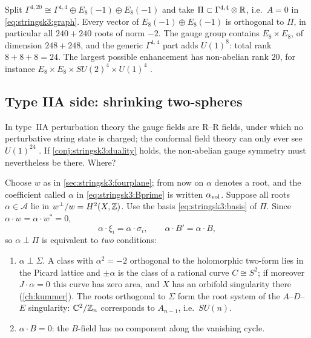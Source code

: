\begin{example}\label{ex:stringsk3:e8e8}
Split $\Gamma^{4,20}\cong\Gamma^{4,4}\oplus E_8(-1)\oplus E_8(-1)$ and take
$\Pi\subset\Gamma^{4,4}\otimes\mathbb{R}$, i.e.\ $A=0$ in \eqref{eq:stringsk3:graph}. Every vector of
$E_8(-1)\oplus E_8(-1)$ is orthogonal to $\Pi$, in particular all $240+240$ roots of norm $-2$.
The gauge group contains $E_8\times E_8$, of dimension $248+248$, and the generic
$\Gamma^{4,4}$ part adds $U(1)^8$: total rank $8+8+8=24$. The largest possible enhancement has
non-abelian rank $20$, for instance $E_8\times E_8\times SU(2)^4\times U(1)^4$
.
\end{example}

\subsection{Type IIA side: shrinking two-spheres}
In type~IIA perturbation theory the gauge fields are R--R fields, under which no perturbative
string state is charged; the conformal field theory can only ever see $U(1)^{24}$
. If \cref{conj:stringsk3:duality} holds, the non-abelian gauge
symmetry must nevertheless be there. Where?

Choose $w$ as in \cref{sec:stringsk3:fourplane}; from now on $\alpha$ denotes a root, and the
coefficient called $\alpha$ in \eqref{eq:stringsk3:Bprime} is written $\alpha_{\rm vol}$. Suppose
all roots $\alpha\in\mathcal A$ lie
in $w^\perp/w=H^2(X,\mathbb{Z})$. Use the basis \eqref{eq:stringsk3:basis} of $\Pi$. Since
$\alpha\cdot w=\alpha\cdot w^*=0$,
\begin{equation}\label{eq:stringsk3:conditions}
  \alpha\cdot\xi_i=\alpha\cdot\sigma_i,\qquad \alpha\cdot B'=\alpha\cdot B ,
\end{equation}
so $\alpha\perp\Pi$ is equivalent to \emph{two} conditions:
\begin{enumerate}[leftmargin=*]
\item $\alpha\perp\Sigma$. A class with $\alpha^2=-2$ orthogonal to the holomorphic two-form
 lies in the Picard lattice and $\pm\alpha$ is the class of a rational curve $C\cong S^2$; if
 moreover $J\cdot\alpha=0$ this curve has zero area, and $X$ has an orbifold singularity there
  (\cref{ch:kummer}). The roots orthogonal to
 $\Sigma$ form the root system of the $A$--$D$--$E$ singularity: $\mathbb{C}^2/\mathbb{Z}_n$ corresponds to
 $A_{n-1}$, i.e.\ $SU(n)$.
\item $\alpha\cdot B=0$: the $B$-field has no component along the vanishing cycle.
\end{enumerate}

